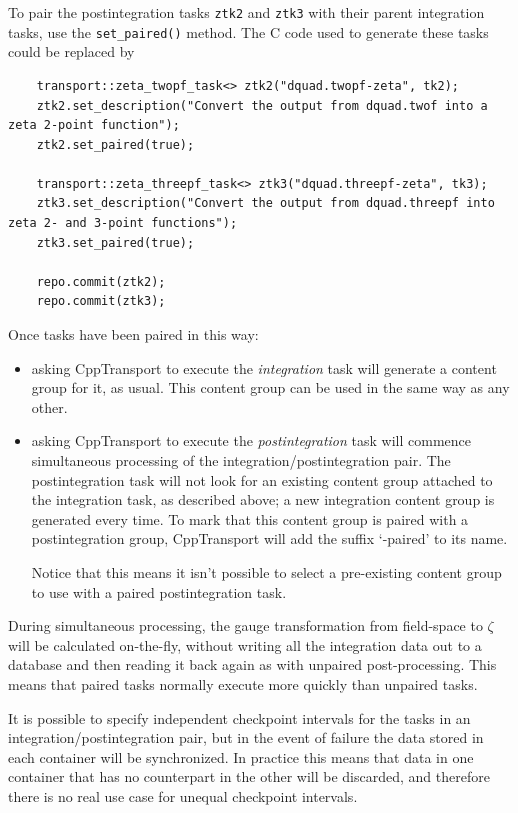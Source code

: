 \documentclass[11pt,a4paper]{article}
\newcommand{\packagefont}{\sffamily}
\newcommand{\CppTransport}{{\packagefont CppTransport}}
\newcommand{\semibold}[1]{{\fontseries{b}\selectfont{#1}}}
\newcommand{\para}[1]{\par\vspace{2mm}\noindent\semibold{{#1.}---}\ignorespaces}
\newcommand\CC{C\nolinebreak\hspace{-.05em}\raisebox{.4ex}{\relsize{-3}{\textbf{+}}}\nolinebreak\hspace{-.10em}\raisebox{.4ex}{\relsize{-3}{\textbf{+}}}}
\begin{document}
To pair
the postintegration tasks
\texttt{ztk2} and
\texttt{ztk3} with their parent integration tasks, use
the
\texttt{set_paired()} method.
The {\CC} code used to generate these tasks could be replaced by
\begin{verbatim}
    transport::zeta_twopf_task<> ztk2("dquad.twopf-zeta", tk2);
    ztk2.set_description("Convert the output from dquad.twof into a zeta 2-point function");
    ztk2.set_paired(true);

    transport::zeta_threepf_task<> ztk3("dquad.threepf-zeta", tk3);
    ztk3.set_description("Convert the output from dquad.threepf into zeta 2- and 3-point functions");
    ztk3.set_paired(true);

    repo.commit(ztk2);
    repo.commit(ztk3);
\end{verbatim}
Once tasks have been paired in this way:
\begin{itemize}
    \item asking {\CppTransport} to execute the \emph{integration} task will generate
    a content group for it, as usual. This content group can be used
    in the same way as any other.
    
    \item asking {\CppTransport} to execute the \emph{postintegration} task
    will commence simultaneous processing of the integration/postintegration pair.
    The postintegration task will not look for an existing content group
    attached to the integration task, as described above;
    a new integration content group is generated every time.
    To mark that this content group is paired with a postintegration group,
    {\CppTransport} will add the suffix `-paired' to its name.
    
    Notice that this means it isn't possible to select a pre-existing
    content group to use with a paired postintegration task.
\end{itemize}
During simultaneous processing, the gauge transformation from field-space
to $\zeta$ will be calculated on-the-fly, without writing all the integration data
out to a database and then reading it back again as with unpaired
post-processing. This means that paired tasks normally execute
more quickly than unpaired tasks.

\para{Task options}
It is possible to specify independent checkpoint intervals for the tasks
in an integration/postintegration pair, but in the event of failure
the data stored in each container will be synchronized.
In practice this means that data in one container that has no counterpart
in the other will be discarded,
and therefore there is no real use case for unequal checkpoint intervals.
\end{document}

